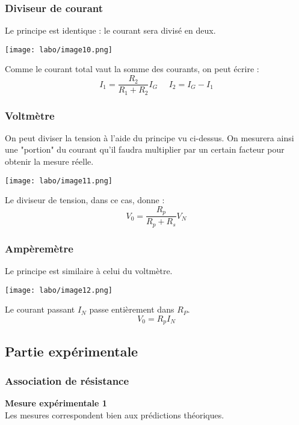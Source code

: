 \documentclass[british,french,11pt, a4paper, openany]{book}
\begin{document}
		\subsubsection*{Diviseur de courant}
		Le principe est identique : le courant sera divisé en deux.
		\begin{center}
			\texttt{[image: labo/image10.png]}
		\end{center}
		Comme le courant total vaut la somme des courants, on peut écrire : 
		\begin{equation}
			I_1 = \frac{R_2}{R_1 + R_2}I_G\ \ \ \ \ \ I_2 = I_G - I_1
		\end{equation}
		
		\subsubsection*{Voltmètre}
		On peut diviser la tension à l'aide du principe vu ci-dessus. On mesurera ainsi une "portion" du courant qu'il faudra multiplier par un certain facteur pour obtenir la mesure réelle.
		\begin{center}
			\texttt{[image: labo/image11.png]}
		\end{center}
		Le diviseur de tension, dans ce cas, donne :
		\begin{equation}
			V_0 = \frac{R_p}{R_p + R_s}V_N
		\end{equation}
		\subsubsection*{Ampèremètre}
		Le principe est similaire à celui du voltmètre.
		\begin{center}
			\texttt{[image: labo/image12.png]}
		\end{center}
		Le courant passant $I_N$ passe entièrement dans $R_P$.
		\begin{equation}
			V_0 = R_pI_N
		\end{equation}
		
		\subsection{Partie expérimentale}
		\subsubsection*{Association de résistance}
		\textbf{Mesure expérimentale 1}\\
		Les mesures correspondent bien aux prédictions théoriques.\\
		
\end{document}
